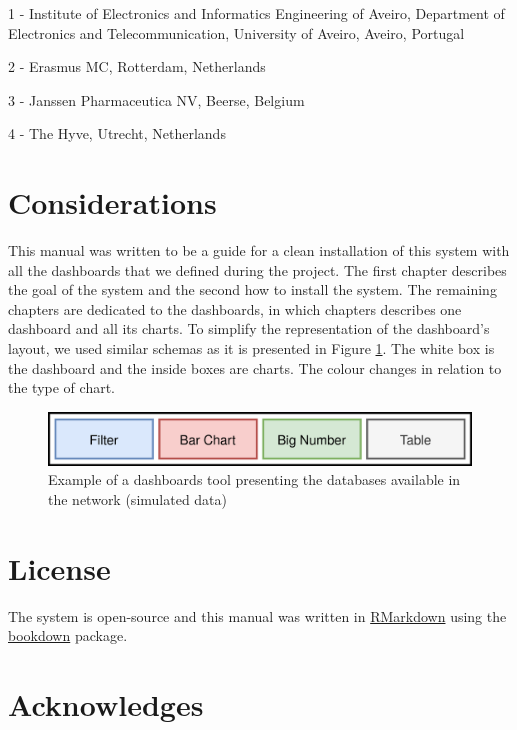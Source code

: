 \documentclass[
]{book}
\begin{document}
1 - Institute of Electronics and Informatics Engineering of Aveiro, Department of Electronics and Telecommunication, University of Aveiro, Aveiro, Portugal

2 - Erasmus MC, Rotterdam, Netherlands

3 - Janssen Pharmaceutica NV, Beerse, Belgium

4 - The Hyve, Utrecht, Netherlands

\hypertarget{considerations}{%
\section*{Considerations}\label{considerations}}

This manual was written to be a guide for a clean installation of this system with all the dashboards that we defined during the project. The first chapter describes the goal of the system and the second how to install the system. The remaining chapters are dedicated to the dashboards, in which chapters describes one dashboard and all its charts. To simplify the representation of the dashboard's layout, we used similar schemas as it is presented in Figure \ref{fig:dashboardsLayout}. The white box is the dashboard and the inside boxes are charts. The colour changes in relation to the type of chart.

\begin{figure}
\includegraphics[width=1\linewidth]{images/dashboardsLayout} \caption{Example of a dashboards tool presenting the databases available in the network (simulated data)}\label{fig:dashboardsLayout}
\end{figure}

\hypertarget{license}{%
\section*{License}\label{license}}

The system is open-source
and this manual was written in \href{https://rmarkdown.rstudio.com}{RMarkdown} using the \href{https://bookdown.org}{bookdown} package.

\hypertarget{acknowledges}{%
\section*{Acknowledges}\label{acknowledges}}
\end{document}
